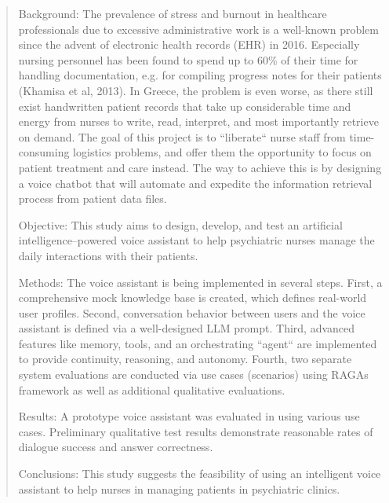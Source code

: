 \begin{abstract}
Background: 
The prevalence of stress and burnout in healthcare professionals due to excessive administrative work is a well-known problem since the advent of electronic health records (EHR) in 2016. Especially nursing personnel has been found to spend up to 60\% of their time for handling documentation, e.g. for compiling progress notes for their patients (Khamisa et al, 2013). In Greece, the problem is even worse, as there still exist handwritten patient records that take up considerable time and energy from nurses to write, read, interpret, and most importantly retrieve on demand. The goal of this project is to ``liberate`` nurse staff from time-consuming logistics problems, and offer them the opportunity to focus on patient treatment and care instead. The way to achieve this is by designing a voice chatbot that will automate and expedite the information retrieval process from patient data files. 

Objective:
This study aims to design, develop, and test an artificial intelligence–powered voice assistant to help psychiatric nurses manage the daily interactions with their patients.

Methods:
The voice assistant is being implemented in several steps. First, a comprehensive mock knowledge base is created, which defines real-world user profiles. Second, conversation behavior between users and the voice assistant is defined via a well-designed LLM prompt. Third, advanced features like memory, tools, and an orchestrating ``agent`` are implemented to provide continuity, reasoning, and autonomy. Fourth, two separate system evaluations are conducted via use cases (scenarios) using RAGAs framework as well as additional qualitative evaluations. 

Results:
A prototype voice assistant was evaluated in using various use cases. Preliminary qualitative test results demonstrate reasonable rates of dialogue success and answer correctness.

Conclusions:
This study suggests the feasibility of using an intelligent voice assistant to help nurses in managing patients in psychiatric clinics.
\end{abstract}
